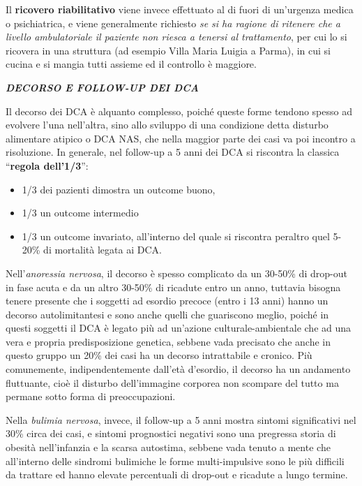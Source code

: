\documentclass[]{article}
\begin{document}
Il \textbf{ricovero riabilitativo} viene invece effettuato al di fuori
di un'urgenza medica o psichiatrica, e viene generalmente richiesto
\emph{se si ha ragione di ritenere che a livello ambulatoriale il
paziente non riesca a tenersi al trattamento}, per cui lo si ricovera in
una struttura (ad esempio Villa Maria Luigia a Parma), in cui si cucina
e si mangia tutti assieme ed il controllo è maggiore.

\textbf{\emph{DECORSO E FOLLOW-UP DEI DCA}}

Il decorso dei DCA è alquanto complesso, poiché queste forme tendono
spesso ad evolvere l'una nell'altra, sino allo sviluppo di una
condizione detta disturbo alimentare atipico o DCA NAS, che nella
maggior parte dei casi va poi incontro a risoluzione. In generale, nel
follow-up a 5 anni dei DCA si riscontra la classica ``\textbf{regola
dell'1/3}'':

\begin{itemize}
\item
  1/3 dei pazienti dimostra un outcome buono,
\item
  1/3 un outcome intermedio
\item
  1/3 un outcome invariato, all'interno del quale si riscontra peraltro
  quel 5-20\% di mortalità legata ai DCA.
\end{itemize}

Nell'\emph{anoressia nervosa}, il decorso è spesso complicato da un
30-50\% di drop-out in fase acuta e da un altro 30-50\% di ricadute
entro un anno, tuttavia bisogna tenere presente che i soggetti ad
esordio precoce (entro i 13 anni) hanno un decorso autolimitantesi e
sono anche quelli che guariscono meglio, poiché in questi soggetti il
DCA è legato più ad un'azione culturale-ambientale che ad una vera e
propria predisposizione genetica, sebbene vada precisato che anche in
questo gruppo un 20\% dei casi ha un decorso intrattabile e cronico. Più
comunemente, indipendentemente dall'età d'esordio, il decorso ha un
andamento fluttuante, cioè il disturbo dell'immagine corporea non
scompare del tutto ma permane sotto forma di preoccupazioni.

Nella \emph{bulimia nervosa}, invece, il follow-up a 5 anni mostra
sintomi significativi nel 30\% circa dei casi, e sintomi prognostici
negativi sono una pregressa storia di obesità nell'infanzia e la scarsa
autostima, sebbene vada tenuto a mente che all'interno delle sindromi
bulimiche le forme multi-impulsive sono le più difficili da trattare ed
hanno elevate percentuali di drop-out e ricadute a lungo termine.
\end{document}
